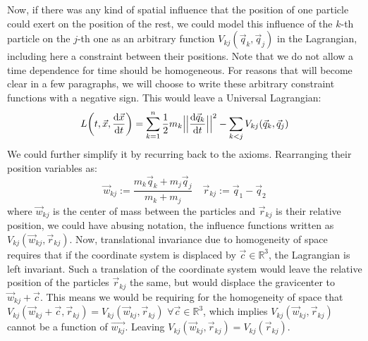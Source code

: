 \documentclass[11pt, a4paper]{article} %
\newcommand{\R}{\mathbb{R}} %
\begin{document}
Now, if there was any kind of spatial influence that the position of one particle could exert on the position of the rest, we could model this influence of the $k$-th particle on the $j$-th one as an arbitrary function $V_{kj}(\vec{q}_k, \vec{q}_j)$ in the Lagrangian, including here a constraint between their positions. Note that we do not allow a time dependence for time should be homogeneous. For reasons that will become clear in a few paragraphs, we will choose to write these arbitrary constraint functions with a negative sign. This would leave a Universal Lagrangian:
\begin{equation}
L\qty(t, \vec{x}, \dv{\vec{x}}{t})=\sum_{k=1}^n\frac{1}{2}m_k\Big|\Big|\dv{\vec{q}_k}{t}\Big|\Big|^2-\sum_{k<j}V_{kj}(\vec{q}_k, \vec{q}_j)
\end{equation}
We could further simplify it by recurring back to the axioms. Rearranging their position variables as:
\begin{equation}
\vec{w}_{kj}:=\frac{m_k\vec{q}_k+m_j\vec{q}_j}{m_k+m_j} \quad \vec{r}_{kj}:=\vec{q}_1-\vec{q}_2
\end{equation}
where $\vec{w}_{kj}$ is the center of mass between the particles and $\vec{r}_{kj}$ is their relative position, we could have abusing notation, the influence functions written as $V_{kj}(\vec{w}_{kj}, \vec{r}_{kj})$. Now, translational invariance due to homogeneity of space requires that if the coordinate system is displaced by $\vec{c}\in\R^3$, the Lagrangian is left invariant. Such a translation of the coordinate system would leave the relative position of the particles $\vec{r}_{kj}$ the same, but would displace the gravicenter to $\vec{w}_{kj}+\vec{c}$. This means we would be requiring for the homogeneity of space that $V_{kj}(\vec{w}_{kj}+\vec{c},\vec{r}_{kj})=V_{kj}(\vec{w}_{kj},\vec{r}_{kj})$ $\forall \vec{c}\in\R^3$, which implies $V_{kj}(\vec{w}_{kj},\vec{r}_{kj})$ cannot be a function of $\vec{w_{kj}}$. Leaving $V_{kj}(\vec{w}_{kj},\vec{r}_{kj})=V_{kj}(\vec{r}_{kj})$.
\end{document}
